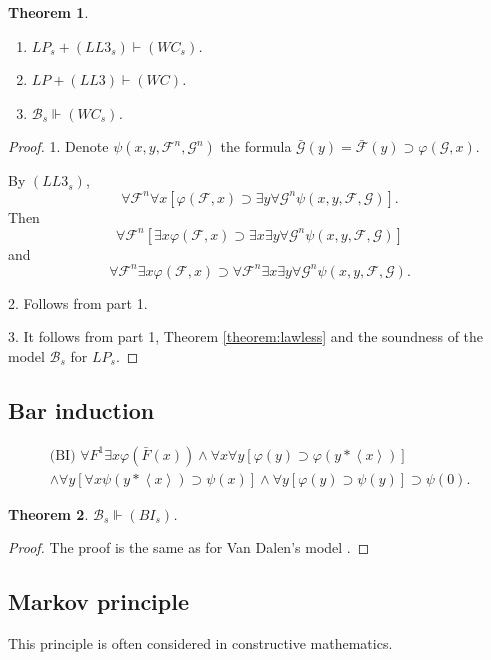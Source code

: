 \documentclass{asl}
\newtheorem{theorem}{Theorem}[section]
\theoremstyle{definition}
\begin{document}
\begin{theorem}
\begin{enumerate}
\item $LP_s+(LL3_s)\vdash (WC_s)$.
\item $LP+(LL3)\vdash (WC)$.
\item $\mathcal{B}_s \Vdash (WC_s)$.
\end{enumerate}

\label{theorem:WC}
\end{theorem}
\begin{proof}
1. Denote $\psi(x,y,\mathcal{F}^n,\mathcal{G}^n)$ the formula $ \mathcal{\bar{G}}(y)=\mathcal{\bar{F}}(y) \supset\varphi(\mathcal{G},x)$.

By $(LL3_s)$, 
\[\forall \mathcal{F}^n \forall x \left[\varphi(\mathcal{F},x) \supset \exists y \forall \mathcal{G}^n \psi(x,y,\mathcal{F},\mathcal{G}) \right]. \]
Then 
\[\forall \mathcal{F}^n \left[\exists x \varphi(\mathcal{F},x) \supset \exists x\exists y \forall \mathcal{G}^n \psi(x,y,\mathcal{F},\mathcal{G}) \right] \]
and
\[\forall \mathcal{F}^n \exists x \varphi(\mathcal{F},x) \supset \forall \mathcal{F}^n\exists x\exists y \forall \mathcal{G}^n \psi(x,y,\mathcal{F},\mathcal{G}).\]

2. Follows from part 1.

3. It follows from part 1, Theorem \ref{theorem:lawless} and the soundness of the model $\mathcal{B}_s$ for $ LP_s $.
\end{proof}

\subsection{Bar induction}
\begin{multline*}
\text{(BI)   } \forall F^1 \exists x \varphi(\bar{F}(x))\wedge 
\forall x\forall y [\varphi(y)\supset \varphi(y*\left\langle x\right\rangle ) ]
\\
\wedge 
\forall y[\forall x\psi(y*\left\langle x\right\rangle)\supset\psi(x)]\wedge
\forall y[\varphi(y)\supset\psi(y)]\supset\psi(0).
\end{multline*}
\begin{theorem}
$\mathcal{B}_s \Vdash (BI_{s}) $.
\label{theorem:BI}
\end{theorem}

\begin{proof}
The proof is the same as for Van Dalen's model \cite{vand78}.
\end{proof}

\subsection{Markov principle}
This principle is often considered in constructive mathematics.
\end{document}
